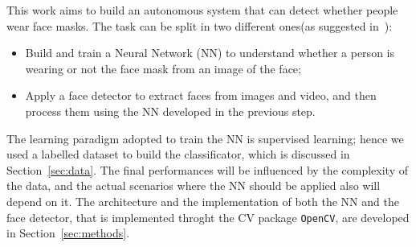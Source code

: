 \documentclass[10pt,twocolumn,letterpaper]{article}
\begin{document}
This work aims to build an autonomous system that can detect whether people wear face masks. The task can be split in two different ones(as suggested in~\cite{PyImage}):
\begin{itemize}
    \item Build and train a Neural Network (NN) to understand whether a person is wearing or not the face mask from an image of the face;
    \item Apply a face detector to extract faces from images and video, and then process them using the NN developed in the previous step.
\end{itemize}

The learning paradigm adopted to train the NN is supervised learning; hence we used a labelled dataset to build the classificator, which is discussed in Section~\ref{sec:data}. The final performances will be influenced by the complexity of the data, and the actual scenarios where the NN should be applied also will depend on it. The architecture and the implementation of both the NN and the face detector, that is implemented throght the CV package \texttt{OpenCV}, are developed in Section~\ref{sec:methods}.
\end{document}
